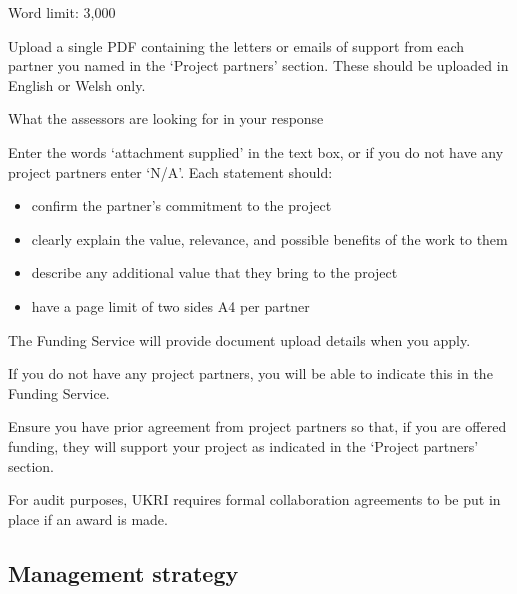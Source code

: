 \documentclass[11pt]{article}
\newenvironment{instruction}{%
    \begin{tcolorbox}[breakable,colback=red!5,colframe=red,title=Instruction]%
	}{%
    	\end{tcolorbox}%
	}
\begin{document}
\begin{instruction}

Word limit: 3,000

Upload a single PDF containing the letters or emails of support from each
partner you named in the ‘Project partners’ section. These should be uploaded
in English or Welsh only.

What the assessors are looking for in your response

Enter the words ‘attachment supplied’ in the text box, or if you do not have any
project partners enter ‘N/A’. Each statement should:

\begin{itemize}

    \item confirm the partner’s commitment to the project

    \item clearly explain the value, relevance, and possible benefits of the
    work to them

    \item describe any additional value that they bring to the project

	\item have a page limit of two sides A4 per partner

\end{itemize}

The Funding Service will provide document upload details when you apply.

If you do not have any project partners, you will be able to indicate this in
the Funding Service.

Ensure you have prior agreement from project partners so that, if you are
offered funding, they will support your project as indicated in the ‘Project
partners’ section.

For audit purposes, UKRI requires formal collaboration agreements to be put in
place if an award is made.

\end{instruction}
% 

\pagebreak
\subsection{Management strategy}
\end{document}
